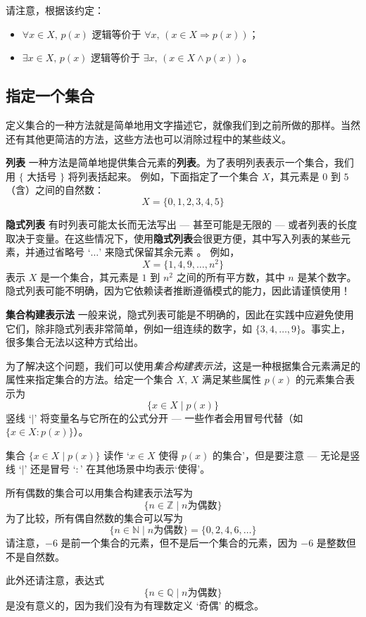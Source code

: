 请注意，根据该约定：
\begin{itemize}
\item $\forall x \in X,\, p(x)$ 逻辑等价于 $\forall x,\, (x \in X \Rightarrow p(x))$；
\item $\exists x \in X,\, p(x)$ 逻辑等价于 $\exists x,\, (x \in X \wedge p(x))$。
\end{itemize}

\subsection*{指定一个集合}
定义集合的一种方法就是简单地用文字描述它，就像我们到之前所做的那样。当然还有其他更简洁的方法，这些方法也可以消除过程中的某些歧义。

\textbf{列表}
一种方法是简单地提供集合元素的\textbf{列表}。为了表明列表表示一个集合，我们用 $\{$ 大括号 $\}$ \inlatex{\{,\textbackslash{}\}}\lindexmmc{\{\dots\textbackslash{}\}}{$\{\dots\}$} 将列表括起来。 例如，下面指定了一个集合 $X$，其元素是 $0$ 到 $5$（含）之间的自然数：
\[ X = \{ 0, 1, 2, 3, 4, 5 \} \]

\textbf{隐式列表}
有时列表可能太长而无法写出 --- 甚至可能是无限的 --- 或者列表的长度取决于变量。在这些情况下，使用\textbf{隐式列表}会很更方便，其中写入列表的某些元素，并通过省略号 `$\dots$'  来隐式保留其余元素 。 例如，
\[ X = \{ 1, 4, 9, \dots, n^2 \} \]
表示 $X$ 是一个集合，其元素是 $1$ 到 $n^2$ 之间的所有平方数，其中 $n$ 是某个数字。隐式列表可能不明确，因为它依赖读者推断遵循模式的能力，因此请谨慎使用！

\textbf{集合构建表示法}
一般来说，隐式列表可能是不明确的，因此在实践中应避免使用它们，除非隐式列表非常简单，例如一组连续的数字，如 $\{3, 4, \dots, 9 \}$。事实上，很多集合无法以这种方式给出。

为了解决这个问题，我们可以使用\textit{集合构建表示法}，这是一种根据集合元素满足的属性来指定集合的方法。给定一个集合 $X$, $X$ 满足某些属性 $p(x)$ 的元素集合表示为
\[ \{ x \in X \mid p(x) \} \]
竖线 `$\mid$'  将变量名与它所在的公式分开 --- 一些作者会用冒号代替（如 $\{ x \in X : p(x) \}$）。

集合 $\{ x \in X \mid p(x) \}$ 读作 `$x \in X$ 使得 $p(x)$ 的集合'，但是要注意 --- 无论是竖线 `$\mid$' 还是冒号 `$:$' 在其他场景中均表示`使得'。

\begin{example}
\label{exSetsSpecifyUniverses}
所有偶数的集合可以用集合构建表示法写为
\[ \{ n \in \mathbb{Z} \mid n \text{为偶数} \} \]
为了比较，所有偶自然数的集合可以写为
\[ \{ n \in \mathbb{N} \mid n \text{为偶数} \} = \{ 0, 2, 4, 6, \dots \} \]
请注意，$-6$ 是前一个集合的元素，但不是后一个集合的元素，因为 $-6$ 是整数但不是自然数。

此外还请注意，表达式
\[ \{ n \in \mathbb{Q} \mid n \text{为偶数} \} \]
是没有意义的，因为我们没有为有理数定义 `奇偶' 的概念。
\end{example}

